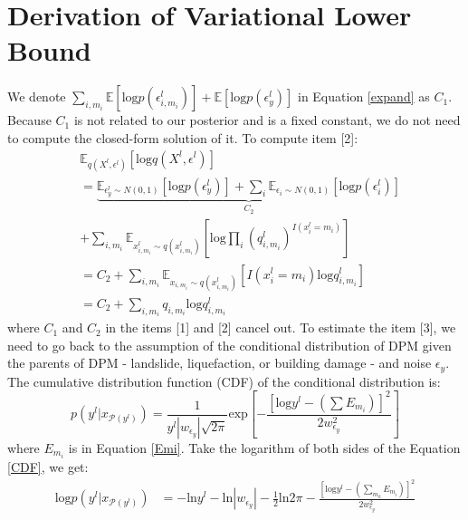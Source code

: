 \documentclass[review]{elsarticle}
\begin{document}
\section{Derivation of Variational Lower Bound}\label{Appendix_lower_bound}
\noindent We denote $\sum_{i,m_i} \mathbb{E}[\text{log}p(\epsilon_{i,m_i}^{l})] + \mathbb{E}[\text{log}p(\epsilon_{y}^{l})]$ in Equation \ref{expand} as $C_{1}$. Because $C_{1}$ is not related to our posterior and is a fixed constant, we do not need to compute the closed-form solution of it. To compute item [2]:
\begin{equation*}
\begin{aligned}
    & \mathbb{E}_{q(X^l,\epsilon^l)}[\text{log}q(X^l,\epsilon^l)] \\
    & = \underbrace{\mathbb{E}_{\epsilon_{y}^l \sim N(0,1)}[\text{log}p(\epsilon_{y}^l)] + \sum_{i}\mathbb{E}_{\epsilon_{i} \sim N(0,1)}[\text{log}p(\epsilon_{i}^l)]}_{C_{2}} \\
    & + \sum_{i, m_{i}}\mathbb{E}_{x^l_{i,m_{i}} \sim q(x^l_{i,m_{i}})}[{\text{log}\prod_{i}(q^l_{i,m_{i}})}^{I(x^l_{i} = m_{i})}] \\
    & = C_{2} + \sum_{i,m _{i}}\mathbb{E}_{x_{i,m_i} \sim q(x^l_{i,m_i})}[I(x^l_i = m_i)\text{log}q^l_{i,m_i}] \\ 
    & = C_2 + \sum_{i, m_{i}}q_{i,m_i}\text{log}q^l_{i,m_i}
\end{aligned}
\end{equation*}
\noindent where $C_1$ and $C_2$ in the items [1] and [2] cancel out. 
To estimate the item [3], we need to go back to the assumption of the conditional distribution of DPM given the parents of DPM - landslide, liquefaction, or building damage - and noise $\epsilon_{y}$. The cumulative distribution function (CDF) of the conditional distribution is:
\begin{equation}
     p(y^l|x_{\mathcal{P}(y^{l})}) = \frac{1}{y^l|w_{\epsilon_{y}}|\sqrt{2\pi}}\text{exp}[ -\frac{[\text{log}y^l - (\sum E_{m_{i}})]^2}{2w_{\epsilon_{y}}^2}]
     \label{CDF}
\end{equation}
\noindent where $E_{m_{i}}$ is in Equation \ref{Emi}. Take the logarithm of both sides of the Equation \ref{CDF}, we get:
\begin{equation}
\label{eq2}
\begin{aligned}
\text{log}p(y^l|x_{\mathcal{P}(y^l)}) & = -\text{ln}y^l - \text{ln}|w_{ \epsilon_{ y}}| - \frac{1}{2}\text{ln}2\pi - \frac{[\text{log}y^l - (\sum_{ m_{ k}}E_{m_{i}})]^2}{2w_{ \epsilon_{ y}}^2}
\end{aligned}
\end{equation}
\end{document}
